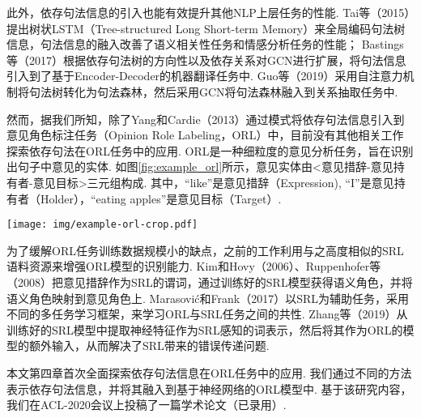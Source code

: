 此外，依存句法信息的引入也能有效提升其他NLP上层任务的性能.
Tai等（2015）提出树状LSTM（Tree-structured Long Short-term Memory）来全局编码句法树信息，句法信息的融入改善了语义相关性任务和情感分析任务的性能；
Bastings等（2017）根据依存句法树的方向性以及依存关系对GCN进行扩展，将句法信息引入到了基于Encoder-Decoder的机器翻译任务中.
Guo等（2019）采用自注意力机制将句法树转化为句法森林，然后采用GCN将句法森林融入到关系抽取任务中.

然而，据我们所知，除了Yang和Cardie（2013）通过模式将依存句法信息引入到意见角色标注任务（Opinion Role Labeling，ORL）中，目前没有其他相关工作探索依存句法在ORL任务中的应用. ORL是一种细粒度的意见分析任务，旨在识别出句子中意见的实体. 如图\ref{fig:example_orl}所示，意见实体由<意见措辞-意见持有者-意见目标>三元组构成. 其中，“like”是意见措辞（Expression), “I”是意见持有者（Holder），“eating apples”是意见目标（Target）.

\begin{figure*}[hb!]
    \centering
    \texttt{[image: img/example-orl-crop.pdf]}
    \caption{ORL的意见角色. }
    \label{fig:example_orl}
\end{figure*}

为了缓解ORL任务训练数据规模小的缺点，之前的工作利用与之高度相似的SRL语料资源来增强ORL模型的识别能力.
Kim和Hovy（2006）、Ruppenhofer等（2008）把意见措辞作为SRL的谓词，通过训练好的SRL模型获得语义角色，并将语义角色映射到意见角色上.
Marasovi{\'c}和Frank（2017）以SRL为辅助任务，采用不同的多任务学习框架，来学习ORL与SRL任务之间的共性. %
Zhang等（2019）从训练好的SRL模型中提取神经特征作为SRL感知的词表示，然后将其作为ORL的模型的额外输入，从而解决了SRL带来的错误传递问题.

本文第四章首次全面探索依存句法信息在ORL任务中的应用. 我们通过不同的方法表示依存句法信息，并将其融入到基于神经网络的ORL模型中. 基于该研究内容，我们在ACL-2020会议上投稿了一篇学术论文（已录用）.

%
%


